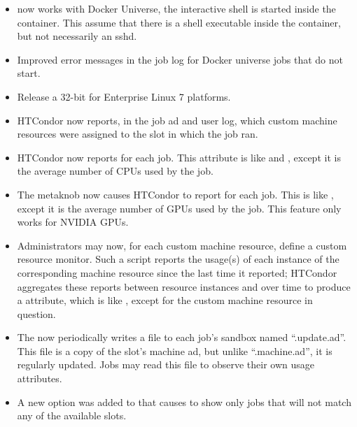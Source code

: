 \begin{itemize}

\item {} now works with Docker Universe, the interactive
shell is started inside the container.  This assume that there is a shell
executable inside the container, but not necessarily an sshd.

\item Improved error messages in the job log for Docker universe jobs
that do not start.

\item Release a 32-bit  for Enterprise Linux 7 platforms.

\item HTCondor now reports, in the job ad and user log, which custom machine
resources were assigned to the slot in which the job ran.

\item HTCondor now reports  for each job.  This attribute is
like  and , except it is the average number
of CPUs used by the job.

\item The  metaknob now causes HTCondor to report
 for each job.  This is like , except it is
the average number of GPUs used by the job.  This feature only works for
NVIDIA GPUs.

\item Administrators may now, for each custom machine resource, define a
custom resource monitor.  Such a script reports the usage(s) of each
instance of the corresponding machine resource since the last time it
reported; HTCondor aggregates these reports between resource instances and
over time to produce a  attribute, which is like
, except for the custom machine resource in question.

\item The  now periodically writes a file to each job's
sandbox named ``.update.ad''.  This file is a copy of the slot's machine ad,
but unlike ``.machine.ad'', it is regularly updated.  Jobs may read this
file to observe their own usage attributes.

\item A new option  was added to  that causes  to show
only jobs that will not match any of the available slots.


\end{itemize}
